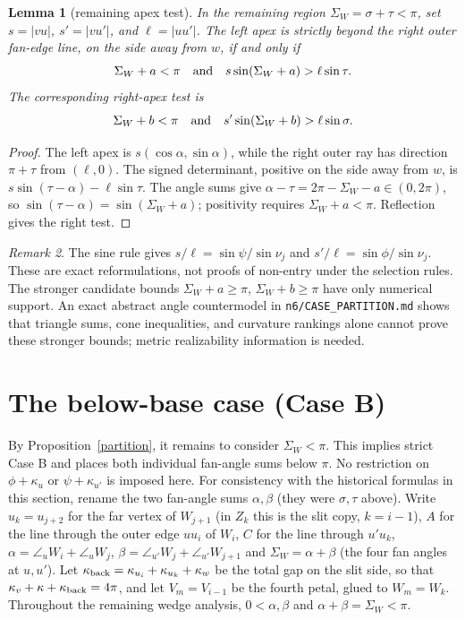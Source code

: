 \documentclass[11pt]{article}
\newtheorem{lemma}{Lemma}
\theoremstyle{definition}
\theoremstyle{remark}
\newtheorem{remark}[lemma]{Remark}
\begin{document}
\begin{lemma}[remaining apex test]\label{apextest}
In the remaining region $\Sigma_W=\sigma+\tau<\pi$, set
$s=|vu|$, $s'=|vu'|$, and $\ell=|uu'|$. The left apex is strictly beyond
the right outer fan-edge line, on the side away from $w$, if and only if
\[
 \Sigma_W+a<\pi\quad\hbox{and}\quad
 s\sin(\Sigma_W+a)>\ell\sin\tau.
\]
The corresponding right-apex test is
\[
 \Sigma_W+b<\pi\quad\hbox{and}\quad
 s'\sin(\Sigma_W+b)>\ell\sin\sigma.
\]
\end{lemma}
\begin{proof}
The left apex is $s(\cos\alpha,\sin\alpha)$, while the right outer
ray has direction $\pi+\tau$ from $(\ell,0)$. The signed determinant,
positive on the side away from $w$, is
$s\sin(\tau-\alpha)-\ell\sin\tau$.
The angle sums give $\alpha-\tau=2\pi-\Sigma_W-a\in(0,2\pi)$,
so $\sin(\tau-\alpha)=\sin(\Sigma_W+a)$; positivity requires
$\Sigma_W+a<\pi$. Reflection gives the right test.
\end{proof}
\begin{remark}
The sine rule gives $s/\ell=\sin\psi/\sin\nu_j$ and
$s'/\ell=\sin\phi/\sin\nu_j$. These are exact reformulations, not
proofs of non-entry under the selection rules. The stronger candidate bounds
$\Sigma_W+a\ge\pi$, $\Sigma_W+b\ge\pi$ have only numerical support.
An exact abstract angle countermodel in \texttt{n6/CASE\_PARTITION.md}
shows that triangle sums, cone inequalities, and curvature rankings alone
cannot prove these stronger bounds; metric realizability information is needed.
\end{remark}

\section{The below-base case (Case B)}\label{sec:caseB}

By Proposition~\ref{partition}, it remains to consider $\Sigma_W<\pi$.
This implies strict Case B and places both individual fan-angle sums below
$\pi$. No restriction on $\phi+\kappa_u$ or $\psi+\kappa_{u'}$ is imposed here.
For consistency with the historical formulas in this section, rename the
two fan-angle sums $\alpha,\beta$ (they were $\sigma,\tau$ above).
Write $u_k=u_{j+2}$ for the far vertex of $W_{j+1}$ (in $Z_k$ this is the slit copy, $k=i-1$), $A$ for the line
through the outer edge $uu_i$ of $W_i$, $C$ for the line through $u'u_k$, $\alpha=\angle_uW_i+\angle_uW_j$,
$\beta=\angle_{u'}W_j+\angle_{u'}W_{j+1}$ and $\Sigma_W=\alpha+\beta$ (the four fan angles at $u,u'$).
Let $\kappa_{\rm back}=\kappa_{u_i}+\kappa_{u_k}+\kappa_w$ be the total gap on the slit side, so that
$\kappa_v+\kappa+\kappa_{\rm back}=4\pi$, and let $V_m=V_{i-1}$ be the fourth petal, glued to $W_m=W_k$.
Throughout the remaining wedge analysis, $0<\alpha,\beta$ and
$\alpha+\beta=\Sigma_W<\pi$.
\end{document}
